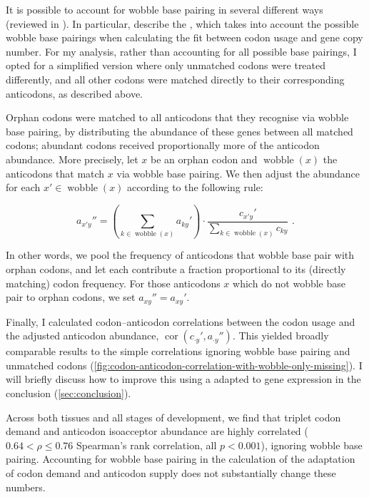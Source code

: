 It is possible to account for wobble base pairing in several different ways
(reviewed in \citet{Gingold:2011}). In particular, \citet{Dos_Reis:2003}
describe the \tai, which takes into account the possible wobble base pairings
when calculating the fit between codon usage and \trna gene copy number. For my
analysis, rather than accounting for all possible base pairings, I opted for a
simplified version where only unmatched codons were treated differently, and all
other codons were matched directly to their corresponding anticodons, as
described above.

Orphan codons were matched to all anticodons that they recognise via wobble base
pairing, by distributing the \trna abundance of these \trna genes between all
matched codons; abundant codons received proportionally more of the anticodon
abundance. More precisely, let \(x\) be an orphan codon and
\(\operatorname{wobble}(x)\) the anticodons that match \(x\) via wobble base
pairing. We then adjust the abundance for each \(x' \in
\operatorname{wobble}(x)\) according to the following rule:

\begin{equation}
    a_{x'y}'' = \left(\sum_{k \in \operatorname{wobble}(x)} a_{ky}'\right) \cdot
        \frac{c_{x'y}'}{\sum_{k \in \operatorname{wobble}(x)} c_{ky}} \text{\ .}
\end{equation}

In other words, we pool the frequency of anticodons that wobble base pair with
orphan codons, and let each contribute a fraction proportional to its (directly
matching) codon frequency. For those anticodons \(x\) which do not wobble base
pair to orphan codons, we set \(a_{xy}'' = a_{xy}'\).

Finally, I calculated codon--anticodon correlations between the codon usage and
the adjusted anticodon abundance, \(\operatorname{cor}(c_{\cdot y}', a_{\cdot
y}'')\). This yielded broadly comparable results to the simple correlations
ignoring wobble base pairing and unmatched codons
(\cref{fig:codon-anticodon-correlation-with-wobble-only-missing}). I will
briefly discuss how to improve this using a \tai adapted to \trna gene
expression in the conclusion (\cref{sec:conclusion}).

Across both tissues and all stages of development, we find that \mrna triplet
codon demand and \trna anticodon isoacceptor abundance are highly correlated
(\(0.64 < \rho \leq 0.76\) Spearman’s rank correlation, all \(p < 0.001\)),
ignoring wobble base pairing. Accounting for wobble base pairing in the
calculation of the adaptation of codon demand and anticodon supply does not
substantially change these numbers.

